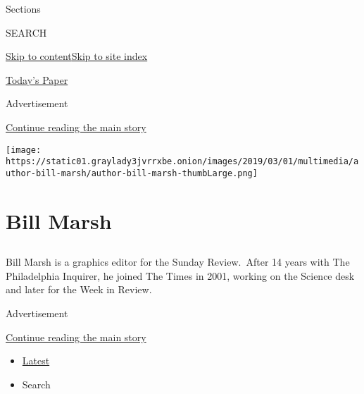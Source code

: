 Sections

SEARCH

\protect\hyperlink{site-content}{Skip to
content}\protect\hyperlink{site-index}{Skip to site index}

\href{https://myaccount.nytimes3xbfgragh.onion/auth/login?response_type=cookie\&client_id=vi}{}

\href{https://www.nytimes3xbfgragh.onion/section/todayspaper}{Today's
Paper}

Advertisement

\protect\hyperlink{after-top}{Continue reading the main story}

\texttt{[image: https://static01.graylady3jvrrxbe.onion/images/2019/03/01/multimedia/author-bill-marsh/author-bill-marsh-thumbLarge.png]}

\hypertarget{bill-marsh}{%
\section{Bill Marsh}\label{bill-marsh}}

\subsection{}

Bill Marsh is a graphics editor for the Sunday Review.~After 14 years
with The Philadelphia Inquirer, he joined The Times in 2001, working on
the Science desk and later for the Week in Review.

Advertisement

\protect\hyperlink{after-mid1}{Continue reading the main story}

\begin{itemize}
\tightlist
\item
  \protect\hyperlink{stream-panel}{Latest}
\item
  Search
\end{itemize}

